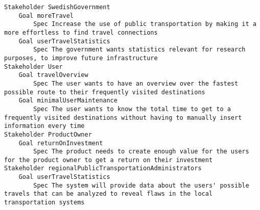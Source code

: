 

\begin{lstlisting}
Stakeholder SwedishGovernment
	Goal moreTravel
		Spec Increase the use of public transportation by making it a more effortless to find travel connections
	Goal userTravelStatistics
		Spec The government wants statistics relevant for research purposes, to improve future infrastructure
Stakeholder User
	Goal travelOverview
		Spec The user wants to have an overview over the fastest possible route to their frequently visited destinations
	Goal minimalUserMaintenance
		Spec The user wants to know the total time to get to a frequently visited destinations without having to manually insert information every time
Stakeholder ProductOwner
	Goal returnOnInvestment
		Spec The product needs to create enough value for the users for the product owner to get a return on their investment
Stakeholder regionalPublicTransportationAdministrators
	Goal userTravelStatistics
		Spec The system will provide data about the users' possible travels that can be analyzed to reveal flaws in the local transportation systems

\end{lstlisting}